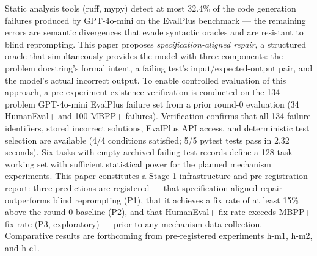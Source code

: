 
Static analysis tools (ruff, mypy) detect at most 32.4\% of the code generation failures produced by GPT-4o-mini on the EvalPlus benchmark --- the remaining errors are semantic divergences that evade syntactic oracles and are resistant to blind reprompting. This paper proposes \textit{specification-aligned repair}, a structured oracle that simultaneously provides the model with three components: the problem docstring's formal intent, a failing test's input/expected-output pair, and the model's actual incorrect output. To enable controlled evaluation of this approach, a pre-experiment existence verification is conducted on the 134-problem GPT-4o-mini EvalPlus failure set from a prior round-0 evaluation (34 HumanEval+ and 100 MBPP+ failures). Verification confirms that all 134 failure identifiers, stored incorrect solutions, EvalPlus API access, and deterministic test selection are available (4/4 conditions satisfied; 5/5 pytest tests pass in 2.32 seconds). Six tasks with empty archived failing-test records define a 128-task working set with sufficient statistical power for the planned mechanism experiments. This paper constitutes a Stage 1 infrastructure and pre-registration report: three predictions are registered --- that specification-aligned repair outperforms blind reprompting (P1), that it achieves a fix rate of at least 15\% above the round-0 baseline (P2), and that HumanEval+ fix rate exceeds MBPP+ fix rate (P3, exploratory) --- prior to any mechanism data collection. Comparative results are forthcoming from pre-registered experiments h-m1, h-m2, and h-c1.

